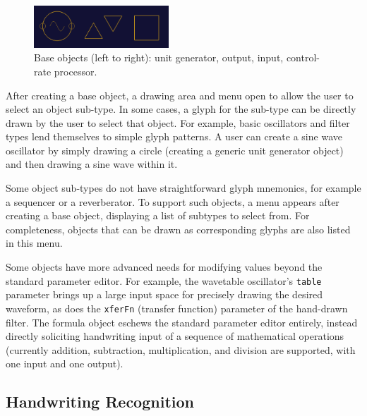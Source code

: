 \documentclass{nime-alternate}
\begin{document}
\begin{figure}[h]
	\centering
		\includegraphics[width=0.45\textwidth]{figures/baseobjects.png}
	\caption{Base objects (left to right): unit generator, output, input, control-rate processor.}
	\label{fig:baseObjects}
\end{figure}

After creating a base object, a drawing area and menu open to allow the user to select an object sub-type. 
In some cases, a glyph for the sub-type can be directly drawn by the user to select that object. 
For example, basic oscillators and filter types lend themselves to simple glyph patterns. 
A user can create a sine wave oscillator by simply drawing a circle (creating a generic unit generator object) and then drawing a sine wave within it. 

Some object sub-types do not have straightforward glyph mnemonics, for example a sequencer or a reverberator. 
To support such objects, a menu appears after creating a base object, displaying a list of subtypes to select from. 
For completeness, objects that can be drawn as corresponding glyphs are also listed in this menu.


Some objects have more advanced needs for modifying values beyond the standard parameter editor.  
For example, the wavetable oscillator's \texttt{table} parameter brings up a large input space for precisely drawing the desired waveform, as does the \texttt{xferFn} (transfer function) parameter of the hand-drawn filter. 
The formula object eschews the standard parameter editor entirely, instead directly soliciting handwriting input of a sequence of mathematical operations (currently addition, subtraction, multiplication, and division are supported, with one input and one output). 

\subsection{Handwriting Recognition}
\label{sec:HandwritingRecognition}
\end{document}
